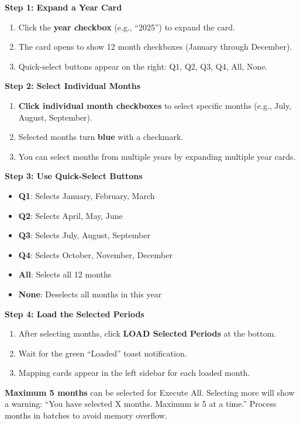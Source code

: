 \documentclass[11pt,a4paper]{article}
\begin{document}
\begin{stepbox}
\textbf{Step 1: Expand a Year Card}
\begin{enumerate}[leftmargin=*, itemsep=4pt]
\item Click the \textbf{year checkbox} (e.g., ``2025'') to expand the card.
\item The card opens to show 12 month checkboxes (January through December).
\item Quick-select buttons appear on the right: Q1, Q2, Q3, Q4, All, None.
\end{enumerate}

\textbf{Step 2: Select Individual Months}
\begin{enumerate}[leftmargin=*, itemsep=4pt]
\item \textbf{Click individual month checkboxes} to select specific months (e.g., July, August, September).
\item Selected months turn \textbf{blue} with a checkmark.
\item You can select months from multiple years by expanding multiple year cards.
\end{enumerate}

\textbf{Step 3: Use Quick-Select Buttons}
\begin{itemize}[leftmargin=*, itemsep=2pt]
\item \textbf{Q1}: Selects January, February, March
\item \textbf{Q2}: Selects April, May, June
\item \textbf{Q3}: Selects July, August, September
\item \textbf{Q4}: Selects October, November, December
\item \textbf{All}: Selects all 12 months
\item \textbf{None}: Deselects all months in this year
\end{itemize}

\textbf{Step 4: Load the Selected Periods}
\begin{enumerate}[leftmargin=*, itemsep=4pt]
\item After selecting months, click \textbf{LOAD Selected Periods} at the bottom.
\item Wait for the green ``Loaded'' toast notification.
\item Mapping cards appear in the left sidebar for each loaded month.
\end{enumerate}
\end{stepbox}

\begin{warningbox}
\textbf{Maximum 5 months} can be selected for Execute All. Selecting more will show a warning: ``You have selected X months. Maximum is 5 at a time.'' Process months in batches to avoid memory overflow.
\end{warningbox}
\end{document}
